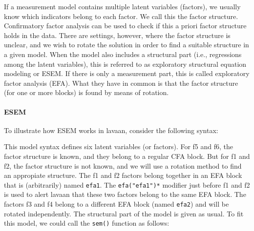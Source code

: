 If a measurement model contains multiple latent variables (factors), we
usually know which indicators belong to each factor. We call this the
factor structure. Confirmatory factor analysis can be used to check if
this a priori factor structure holds in the data. There are settings,
however, where the factor structure is unclear, and we wish to rotate
the solution in order to find a suitable structure in a given model.
When the model also includes a structural part (i.e., regressions among
the latent variables), this is referred to as exploratory structural
equation modeling or ESEM. If there is only a measurement part, this is
called exploratory factor analysis (EFA). What they have in common is
that the factor structure (for one or more blocks) is found by means of
rotation.

\hypertarget{esem}{%
\paragraph{ESEM}\label{esem}}

To illustrate how ESEM works in lavaan, consider the following syntax:

\begin{Shaded}
\begin{Highlighting}[]
\OtherTok{\textless{}{-}} \StringTok{\textquotesingle{}}



\StringTok{\textquotesingle{}}
\end{Highlighting}
\end{Shaded}

This model syntax defines six latent variables (or factors). For f5 and
f6, the factor structure is known, and they belong to a regular CFA
block. But for f1 and f2, the factor structure is not known, and we will
use a rotation method to find an appropiate structure. The f1 and f2
factors belong together in an EFA block that is (arbitrarily) named
\texttt{efa1}. The \texttt{efa("efa1")*} modifier just before f1 and f2
is used to alert lavaan that these two factors belong to the same EFA
block. The factors f3 and f4 belong to a different EFA block (named
\texttt{efa2}) and will be rotated independently. The structural part of
the model is given as usual. To fit this model, we could call the
\texttt{sem()} function as follows:

